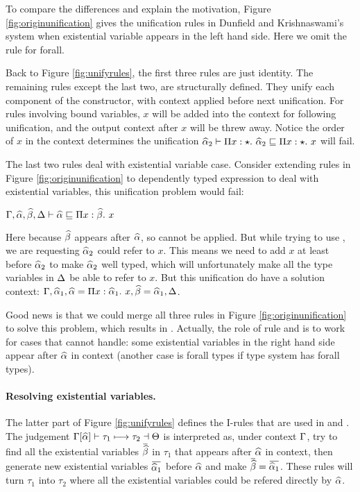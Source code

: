 To compare the differences and explain the motivation, Figure \ref{fig:originunification} gives the unification rules in Dunfield and Krishnaswami's system when existential variable appears in the left hand side. Here we omit the rule for forall.

Back to Figure \ref{fig:unifyrules}, the first three rules are just identity. The remaining rules except the last two, are structurally defined. They unify each component of the constructor, with context applied before next unification. For rules involving bound variables, $x$ will be added into the context for following unification, and the output context after $x$ will be threw away. Notice the order of $x$ in the context determines the unification $\widehat{\alpha}_2 \vdash \Pi x:\star.~ \widehat{\alpha}_2 \sqsubseteq \Pi x:\star.~ x$ will fail.

The last two rules deal with existential variable case. Consider extending rules in Figure \ref{fig:originunification} to dependently typed expression to deal with existential variables, this unification problem would fail:

$\Gamma, \widehat{\alpha}, \widehat{\beta}, \Delta \vdash \widehat{\alpha} \sqsubseteq \Pi x:\widehat{\beta}.~ x$

Here because $\widehat{\beta}$ appears after $\widehat{\alpha}$, so  cannot be applied. But while trying to use , we are requesting $\widehat{\alpha}_2$ could refer to  $x$. This means we need to add $x$ at least before $\widehat{\alpha}_2$ to make $\widehat{\alpha}_2$ well typed, which will unfortunately make all the type variables in $\Delta$ be able to refer to $x$. But this unification do have a solution context: $\Gamma, \widehat{\alpha}_1, \widehat{\alpha} = \Pi x:\widehat{\alpha}_1.~ x, \widehat{\beta} = \widehat{\alpha}_1, \Delta$.

Good news is that we could merge all three rules in Figure \ref{fig:originunification} to solve this problem, which results in . Actually, the role of rule  and  is to work for cases that  cannot handle: some existential variables in the right hand side appear after $\widehat{\alpha}$ in context (another case is forall types if type system has forall types).

\paragraph{Resolving existential variables.} The latter part of Figure \ref{fig:unifyrules} defines the I-rules that are used in  and . The judgement $\Gamma[\widehat{\alpha}] \vdash \tau_1 \longmapsto \tau_2 \dashv \Theta$ is interpreted as, under context $\Gamma$, try to find all the existential variables $\overbar \genB$ in $\tau_1$ that appears after $\widehat{\alpha}$ in context, then generate new existential variables $\overbar {\genA_1}$ before $\widehat{\alpha}$ and make $\overbar \genB = \overbar {\genA_1}$. These rules will turn $\tau_1$ into $\tau_2$ where all the existential variables could be refered directly by $\widehat{\alpha}$.


